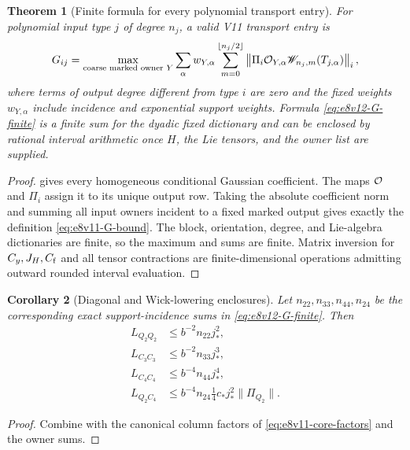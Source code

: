 \documentclass[11pt,oneside]{book}
\newtheorem{theorem}{Theorem}[chapter]
\newtheorem{corollary}[theorem]{Corollary}
\theoremstyle{definition}
\theoremstyle{remark}
\begin{document}
\begin{theorem}[Finite formula for every polynomial transport entry]
\label{thm:e8v12-G-formula}
For polynomial input type \(j\) of degree \(n_j\), a valid V11
transport entry is
\[
 G_{ij}
 =
 \max_{\text{coarse marked owner }Y}
 \sum_{\alpha}
 w_{Y,\alpha}
 \sum_{m=0}^{\lfloor n_j/2\rfloor}
 \left\|
 \Pi_i{\cal O}_{Y,\alpha}
 {\mathscr W}_{n_j,m}(T_{j,\alpha})
 \right\|_i,                                        \label{eq:e8v12-G-finite}
\]
where terms of output degree different from type \(i\) are zero and
the fixed weights \(w_{Y,\alpha}\) include incidence and exponential
support weights.  Formula \eqref{eq:e8v12-G-finite} is a finite sum
for the dyadic fixed dictionary and can be enclosed by rational
interval arithmetic once \(H\), the Lie tensors, and the owner list
are supplied.
\end{theorem}

\begin{proof}
 gives every homogeneous conditional Gaussian
coefficient.  The maps \({\cal O}\) and \(\Pi_i\) assign it to its
unique output row.  Taking the absolute coefficient norm and summing
all input owners incident to a fixed marked output gives exactly the
definition \eqref{eq:e8v11-G-bound}.  The block, orientation, degree,
and Lie-algebra dictionaries are finite, so the maximum and sums are
finite.  Matrix inversion for \(C_y,J_H,C_{\rm f}\) and all tensor
contractions are finite-dimensional operations admitting outward
rounded interval evaluation.
\end{proof}

\begin{corollary}[Diagonal and Wick-lowering enclosures]
\label{cor:e8v12-L-bounds}
Let \(n_{22},n_{33},n_{44},n_{24}\) be the corresponding exact
support-incidence sums in \eqref{eq:e8v12-G-finite}.  Then
\begin{align}
 L_{Q_2Q_2}&\le b^{-2}n_{22}j_*^2,                  \label{eq:e8v12-L22}\\
 L_{C_3C_3}&\le b^{-2}n_{33}j_*^3,                  \label{eq:e8v12-L33}\\
 L_{C_4C_4}&\le b^{-4}n_{44}j_*^4,                  \label{eq:e8v12-L44}\\
 L_{Q_2C_4}&\le b^{-4}n_{24}\tfrac14c_*j_*^2
 \|\Pi_{Q_2}\|.                                     \label{eq:e8v12-L24}
\end{align}
\end{corollary}

\begin{proof}
Combine  with the canonical column
factors of \eqref{eq:e8v11-core-factors} and the owner sums.
\end{proof}
\end{document}
